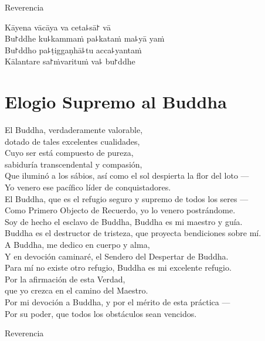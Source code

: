 \begin{instruction}
  Reverencia
\end{instruction}

Kāyena vācāya va ceta꜕sā꜓ vā\\
Bu꜓ddhe ku꜕kammaṁ pa꜕kataṁ ma꜕yā yaṁ\\
Bu꜓ddho pa꜕ṭiggaṇhā꜕tu acca꜕yantaṁ\\
Kālantare sa꜓ṁvarituṁ va꜕ bu꜓ddhe

\clearpage

\chapter{Elogio Supremo al Buddha}

\begin{leader}
\end{leader}

El Buddha, verdaderamente valorable,\\
\vin dotado de tales excelentes cualidades,\\
Cuyo ser está compuesto de pureza,\\
\vin sabiduría transcendental y compasión,\\
Que iluminó a los sábios, así como el sol despierta la flor del loto ---\\
Yo venero ese pacífico líder de conquistadores.\\
El Buddha, que es el refugio seguro y supremo de todos los seres ---\\
Como Primero Objecto de Recuerdo, yo lo venero postrándome.\\
Soy de hecho el esclavo de Buddha, Buddha es mi maestro y guía.\\
Buddha es el destructor de tristeza, que proyecta bendiciones sobre mí.\\
A Buddha, me dedico en cuerpo y alma,\\
Y en devoción caminaré, el Sendero del Despertar de Buddha.\\
Para mí no existe otro refugio, Buddha es mi excelente refugio.\\
Por la afirmación de esta Verdad,\\
\vin que yo crezca en el camino del Maestro.\\
Por mi devoción a Buddha, y por el mérito de esta práctica ---\\
Por su poder, que todos los obstáculos sean vencidos.

\begin{instruction}
  Reverencia
\end{instruction}

